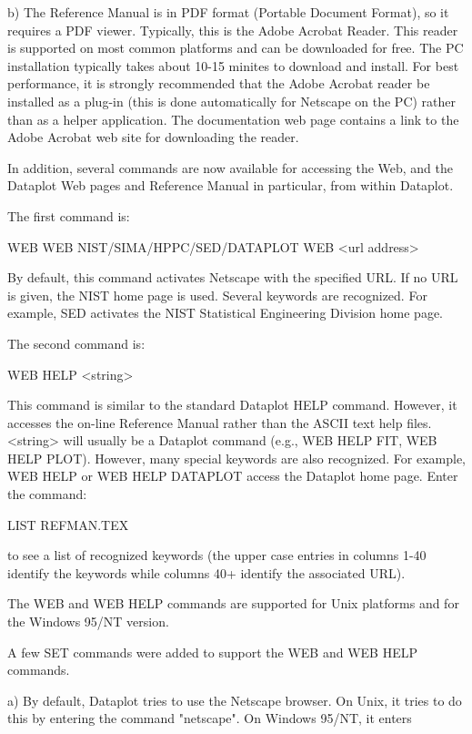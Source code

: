 {    b) The Reference Manual is in PDF format (Portable Document
       Format), so it requires a PDF viewer.  Typically, this is the
       Adobe Acrobat Reader.  This reader is supported on most common
       platforms and can be downloaded for free.  The PC installation 
       typically takes about 10-15 minites to download and install.
       For best performance, it is strongly recommended that the
       Adobe Acrobat reader be installed as a plug-in (this is
       done automatically for Netscape on the PC) rather than
       as a helper application.  The documentation web page contains
       a link to the Adobe Acrobat web site for downloading the
       reader.

    In addition, several commands are now available for accessing
    the Web, and the Dataplot Web pages and Reference Manual in
    particular, from within Dataplot.

    The first command is:

        WEB 
        WEB NIST/SIMA/HPPC/SED/DATAPLOT
        WEB <url address>

    By default, this command activates Netscape with the specified
    URL.  If no URL is given, the NIST home page is used.  Several
    keywords are recognized.  For example, SED activates the
    NIST Statistical Engineering Division home page.

    The second command is:

        WEB HELP <string>

    This command is similar to the standard Dataplot HELP command.
    However, it accesses the on-line Reference Manual rather than
    the ASCII text help files.  <string> will usually be a Dataplot
    command (e.g., WEB HELP FIT, WEB HELP PLOT).  However, many
    special keywords are also recognized.  For example, WEB HELP or
    WEB HELP DATAPLOT access the Dataplot home page.  Enter the
    command:

        LIST REFMAN.TEX

    to see a list of recognized keywords (the upper case entries in
    columns 1-40 identify the keywords while columns 40+ identify the
    associated URL).

    The WEB and WEB HELP commands are supported for Unix platforms
    and for the Windows 95/NT version.

    A few SET commands were added to support the WEB and WEB HELP
    commands.

    a) By default, Dataplot tries to use the Netscape browser.  On
       Unix, it tries to do this by entering the command "netscape".
       On Windows 95/NT, it enters

}

